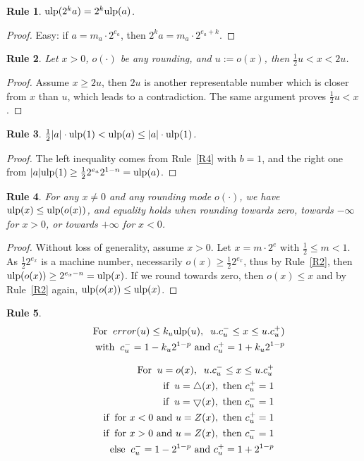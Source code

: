 \documentclass[12pt]{amsart}
\def\n{\textnormal}
\def\pinf{\bigtriangleup}
\def\minf{\bigtriangledown}
\def\ulp{{\rm ulp}}
\newtheorem{Rule}{Rule}
\begin{document}
\begin{Rule} \label{R5}
$\ulp(2^k a) = 2^k \ulp(a)$.
\end{Rule}
\begin{proof}
Easy: if $a = m_a \cdot 2^{e_a}$, then $2^k a = m_a \cdot 2^{e_a+k}$.
\end{proof}

\begin{Rule} \label{R6}
Let $x > 0$, $o(\cdot)$ be any rounding, and $u := o(x)$, then $\frac{1}{2} u
	< x < 2 u$.
\end{Rule}
\begin{proof}
Assume $x \geq 2 u$, then $2u$ is another representable number which is closer 
from $x$ than $u$, which leads to a contradiction. The same argument proves
$\frac{1}{2} u < x$.
\end{proof}

\begin{Rule} \label{R7}
$\frac{1}{2} |a| \cdot \ulp(1) < \ulp(a) \leq |a| \cdot \ulp(1)$.
\end{Rule}
\begin{proof}
The left inequality comes from Rule~\ref{R4} with $b=1$,
and the right one from $|a| \ulp(1) \geq \frac{1}{2} 2^{e_a} 2^{1-n} =\ulp(a)$.
\end{proof}

\begin{Rule} \label{R8}
For any $x \neq 0$ and any rounding mode $o(\cdot)$,
we have $\ulp(x) \leq \ulp(o(x))$, and equality holds when rounding towards
zero, towards $-\infty$ for $x>0$, or towards $+\infty$ for $x<0$.
\end{Rule}
\begin{proof}
Without loss of generality, assume $x > 0$.
Let $x = m \cdot 2^e$ with $\frac{1}{2} \leq m < 1$.
As $\frac{1}{2} 2^{e_x}$ is a machine number, necessarily $o(x) \geq
\frac{1}{2} 2^{e_x}$, thus by Rule~\ref{R2}, then $\ulp(o(x)) \geq
2^{e_x - n} = \ulp(x)$.
If we round towards zero, then $o(x) \leq x$ and by Rule~\ref{R2} again,
$\ulp(o(x)) \leq \ulp(x)$.
\end{proof}

\begin{Rule} \label{R9}
\begin{eqnarray}\nonumber
&&\n{For}\;\;  error(u) \leq k_u \ulp(u),\;\; u.c_u^- \leq x \leq u.c_u^+)\\\nonumber
&&\n{with}\;\;   c_u^{-}=1- k_u 2^{1-p} \n{ and } c_u^{+}=1+ k_u 2^{1-p}
\end{eqnarray}

\begin{eqnarray}\nonumber
&&\n{For}\;\;  u=o(x),\;\; u.c_u^- \leq x \leq u.c_u^+\\\nonumber
&&\n{if}\;\;  u=\pinf(x),\n{ then } c_u^+=1\\\nonumber
&&\n{if}\;\;  u=\minf(x),\n{ then } c_u^-=1\\\nonumber
&&\n{if}\;\;  \n{for $x<0$ and } u=Z(x),\n{ then } c_u^+=1 \\\nonumber
&&\n{if}\;\;  \n{for $x>0$ and } u=Z(x),\n{ then } c_u^-=1 \\\nonumber
&&\n{else}\;\;   c_u^{-}=1-2^{1-p} \n{ and } c_u^{+}=1+2^{1-p}
\end{eqnarray}
\end{Rule}
\end{document}
